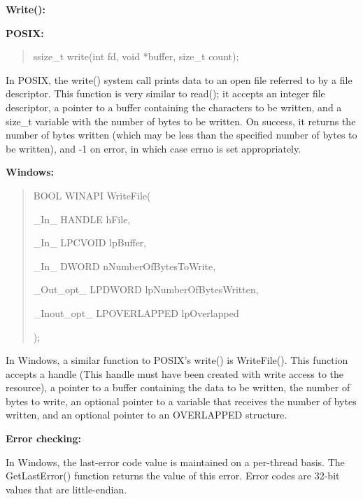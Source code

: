 \documentclass[letterpaper,10pt,titlepage]{article}
\newcommand{\tab}{\hspace*{2em}} %
\begin{document}
\begin{enumerate}
\textbf{Write():}

\textbf{POSIX:}

\begin{quote}
ssize\_t write(int fd, void *buffer, size\_t count);
\end{quote}

\tab In POSIX, the write() system call prints data to an open file referred to by a file descriptor. This function is very similar to read(); it accepts an integer file descriptor, a pointer to a buffer containing the characters to be written, and a size\_t variable with the number of bytes to be written. On success, it returns the number of bytes written (which may be less than the specified number of bytes to be written), and -1 on error, in which case errno is set appropriately. \newline%

\textbf{Windows:} 

\begin{quote}
BOOL WINAPI WriteFile(

\tab\_In\_         HANDLE hFile,

\tab\_In\_         LPCVOID lpBuffer,

\tab\_In\_         DWORD nNumberOfBytesToWrite,

\tab\_Out\_opt\_    LPDWORD lpNumberOfBytesWritten,

\tab\_Inout\_opt\_  LPOVERLAPPED lpOverlapped

);
\end{quote}


\tab In Windows, a similar function to POSIX's write() is WriteFile(). This function accepts a handle (This handle must have been created with write access to the resource), a pointer to a buffer containing the data to be written, the number of bytes to write, an optional pointer to a variable that receives the number of bytes written, and an optional pointer to an OVERLAPPED structure. \newline 


\textbf{Error checking:}\newline


\tab In Windows, the last-error code value is maintained on a per-thread basis. The GetLastError() function returns the value of this error. Error codes are 32-bit values that are little-endian.\newline 


\end{enumerate}
\end{document}
